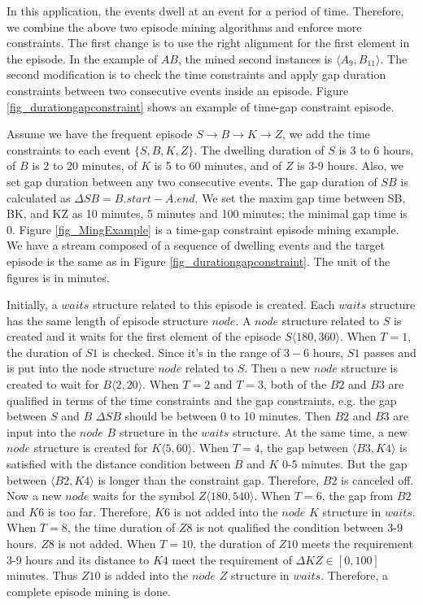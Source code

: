 In this application, 
the events dwell at an event for a period of time. 
Therefore, we combine the above two 
episode mining algorithms and enforce more constraints.
The first change is to 
use the right alignment for the first element in the episode. 
In the example of $AB$, 
the mined second instances is $\langle A_9,B_{11} \rangle$. 
The second modification is to 
check the time constraints and 
apply gap duration constraints between 
two consecutive events inside an episode. 
Figure \ref{fig_durationgapconstraint} shows an example of time-gap constraint episode. 

Assume we have the frequent episode $S\rightarrow B \rightarrow K\rightarrow Z$, 
we add the time constraints to each event $\{S,B,K,Z\}$. 
The dwelling duration of $S$ is 3 to 6 hours,   
of $B$ is 2 to 20 minutes, 
of $K$ is 5 to 60 minutes, 
and of $Z$ is 3-9 hours. 
Also, we set gap duration between any two consecutive events. 
The gap duration of $SB$ is calculated as $\Delta{SB} = B.start - A.end$. 
We set the maxim gap time between SB, BK, and KZ as 
10 minutes, 5 minutes and 100 minutes; 
the minimal gap time is 0. 
Figure \ref{fig_MingExample} is a time-gap constraint episode mining example. 
We have a stream composed of a sequence of dwelling events and the target 
episode is the same as in Figure \ref{fig_durationgapconstraint}.
The unit of the figures is in minutes.  

Initially, a $waits$ structure related to this episode is created. 
Each $waits$ structure has the same length of episode structure $node$. 
A $node$ structure related to $S$ is created 
and it waits for the first 
element of the episode $S\langle 180, 360 \rangle $. 
When $T=1$, the duration of $S1$ is checked. 
Since it's in the range of $3-6$ hours, 
$S1$ passes and is put into the node structure $node$ related to $S$. 
Then a new $node$ structure is created to wait for $B\langle 2, 20 \rangle $. 
When $T=2$ and $T=3$, both of the $B2$ and $B3$ 
are qualified in terms of the time constraints and 
the gap constraints, 
e.g. the gap between $S$ and $B$ $\Delta SB$ should 
be between 0 to 10 minutes. 
Then $B2$ and $B3$ are input into the $node$ $B$ structure in the 
$waits$ structure. 
At the same time, 
a new $node$ structure is created for $K\langle 5, 60 \rangle $. 
When $T=4$, the gap between $\langle B3, K4 \rangle$ 
is satisfied with the distance condition between 
$B$ and $K$ 0-5 minutes. 
But the gap between $\langle B2, K4 \rangle$ 
is longer than the constraint gap. 
Therefore, $B2$ is canceled off. 
Now a new $node$ waits for the symbol $Z\langle 180, 540 \rangle$. 
When $T=6$, the gap from $B2$ and $K6$ is 
too far. Therefore, $K6$ is not added into the $node$ $K$ structure in $waits$.
When $T=8$, the time duration of $Z8$ is not qualified the condition between 3-9 hours. 
$Z8$ is not added. 
When $T=10$, the duration of $Z10$ meets the requirement 3-9 hours 
and its distance to $K4$ meet the requirement 
of $\Delta KZ \in [0,100]$ minutes. 
Thus $Z10$ is added into the $node$ $Z$ structure in $waits$.
Therefore, a complete episode mining is done. 

